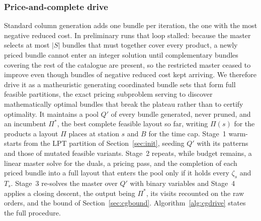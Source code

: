 \documentclass[]{interact}
\begin{document}
\subsubsection{Price-and-complete drive}\label{sec:cgdrive}
Standard column generation adds one bundle per iteration, the one with the most negative reduced cost. In preliminary runs that loop stalled: because the master selects at most $|S|$ bundles that must together cover every product, a newly priced bundle cannot enter an integer solution until complementary bundles covering the rest of the catalogue are present, so the restricted master ceased to improve even though bundles of negative reduced cost kept arriving. We therefore drive it as a matheuristic generating coordinated bundle sets that form full feasible partitions, the exact pricing subproblem serving to discover mathematically optimal bundles that break the plateau rather than to certify optimality. It maintains a pool $Q'$ of every bundle generated, never pruned, and an incumbent $\Pi^{\ast}$, the best complete feasible layout so far, writing $\Pi(s)$ for the products a layout $\Pi$ places at station $s$ and $B$ for the time cap. Stage~1 warm-starts from the LPT partition of Section~\ref{sec:init}, seeding $Q'$ with its patterns and those of mutated feasible variants. Stage~2 repeats, while budget remains, a linear master solve for the duals, a pricing pass, and the completion of each priced bundle into a full layout that enters the pool only if it holds every $\zeta_s$ and $T_s$. Stage~3 re-solves the master over $Q'$ with binary variables and Stage~4 applies a closing descent, the output being $\Pi^{\ast}$, its visits recounted on the raw orders, and the bound of Section~\ref{sec:cgbound}. Algorithm~\ref{alg:cgdrive} states the full procedure.
\end{document}
